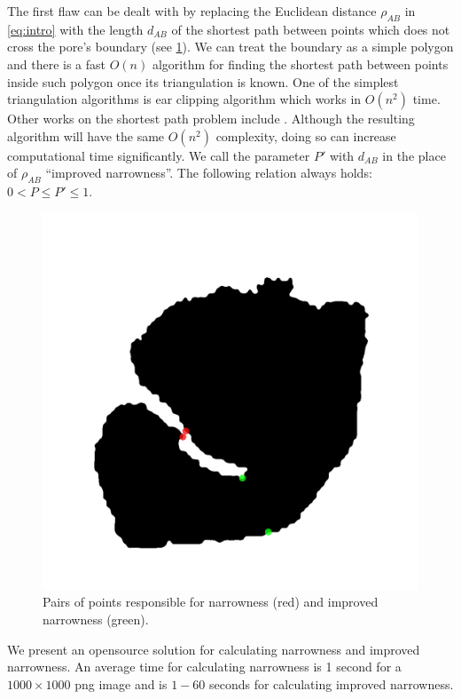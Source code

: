 \documentclass[reprint,amsmath,amssymb,aps,pre,showkeys,showpacs]{revtex4-1}
\newcommand{\highlight}[1]{{\color{red}{#1}}} %
\begin{document}
The first flaw can be dealt with by replacing the Euclidean distance $\rho_{AB}$
in \cref{eq:intro} with the length $d_{AB}$ of the shortest path between points
which does not cross the pore's boundary (see \cref{fig:improved}). We can treat
the boundary as a simple polygon and there is a fast $O(n)$ algorithm for
finding the shortest path between points inside such
polygon\cite{guibas1986linear} once its triangulation is known. One of the
simplest triangulation algorithms is ear clipping
algorithm\cite{eberly2008triangulation} which works in $O(n^2)$ time. Other
works on the shortest path problem include
\cite{asano2010constant,har2014shortest,cleve2019experimental,asano1985visibility}.
Although the resulting algorithm will have the same $O(n^2)$ complexity, doing
so can increase computational time significantly. We call the parameter $P'$ with
$d_{AB}$ in the place of $\rho_{AB}$ ``improved narrowness''. The following
relation always holds: $0 < P \le P' \le 1$.
\begin{figure}
  \centering
  \includegraphics[width=0.9\linewidth,frame]{images/improved.png}
  \caption[]{Pairs of points responsible for narrowness (red) and improved
    narrowness (green).}
  \label{fig:improved}
\end{figure}

We present an opensource solution for calculating narrowness and improved
narrowness. \highlight{E-mail us and buy us coffee so we can send this super
  program to you, no matter where you live! Hurry, this is a limited offer!} An
average time for calculating narrowness is 1 second for a $1000 \times 1000$ png
image and is $1-60$ seconds for calculating improved narrowness.


\end{document}
